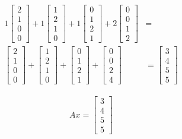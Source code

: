 \documentclass[paper=a4, fontsize=10pt]{scrartcl} %
\begin{document}
	\begin{align*}
		1
		\begin{bmatrix}
			2 \\
			1 \\
			0 \\
			0
		\end{bmatrix}
		+ 1
		\begin{bmatrix}
			1 \\
			2 \\
			1 \\
			0
		\end{bmatrix}
		+ 1
		\begin{bmatrix}
 			0 \\
 			1 \\
 			2 \\
 			1
 		\end{bmatrix}
		+ 2
		\begin{bmatrix}
 			0 \\
 			0 \\
 			1 \\
 			2
 		\end{bmatrix}
 		&= \\
 		\begin{bmatrix}
 			2 \\ 1 \\ 0 \\ 0
 		\end{bmatrix}
 		+
 		\begin{bmatrix}
 			1 \\ 2 \\ 1 \\ 0
 		\end{bmatrix}
 		+
 		\begin{bmatrix}
 			0 \\ 1 \\ 2 \\ 1
 		\end{bmatrix}
 		+
 		\begin{bmatrix}
 			0 \\ 0 \\ 2 \\ 4
 		\end{bmatrix}
 		&=
 		\begin{bmatrix}
 			3 \\ 4 \\ 5 \\ 5
 		\end{bmatrix}
 	\end{align*}

 	\begin{align}
 		Ax =
 		\begin{bmatrix}
 			3 \\ 4 \\ 5 \\ 5
 		\end{bmatrix}
 	\end{align}
\end{document}
